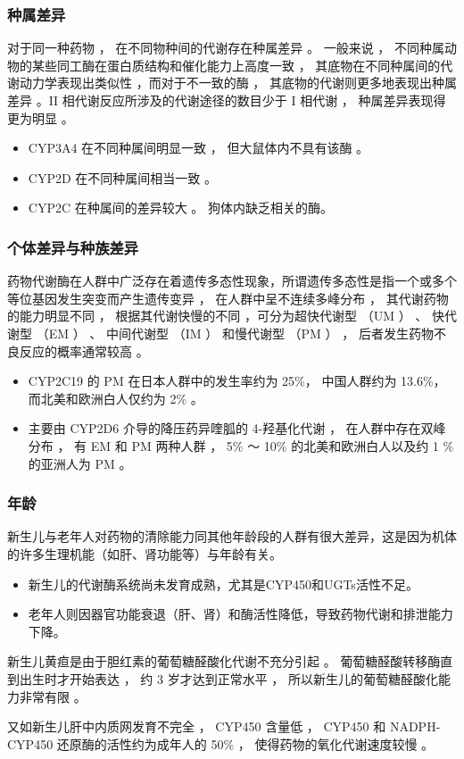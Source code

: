 \documentclass[dvipsnames, svgnames, x11names]{beamer}
\begin{document}
\begin{frame}
    \frametitle{种属差异}
    对于同一种药物 ， 在不同物种间的代谢存在种属差异 。 一般来说 ， 不同种属动物的某些同工酶在蛋白质结构和催化能力上高度一致 ， 其底物在不同种属间的代谢动力学表现出类似性 ，而对于不一致的酶 ， 其底物的代谢则更多地表现出种属差异 。II 相代谢反应所涉及的代谢途径的数目少于 I 相代谢 ， 种属差异表现得更为明显 。
    \begin{itemize}
      \item CYP3A4 在不同种属间明显一致 ， 但大鼠体内不具有该酶 。
      \item CYP2D 在不同种属间相当一致 。
      \item CYP2C 在种属间的差异较大 。 狗体内缺乏相关的酶。
    \end{itemize}
\end{frame}


\begin{frame}
    \frametitle{个体差异与种族差异}
    药物代谢酶在人群中广泛存在着遗传多态性现象，所谓遗传多态性是指一个或多个等位基因发生突变而产生遗传变异 ， 在人群中呈不连续多峰分布 ， 其代谢药物的能力明显不同 ， 根据其代谢快慢的不同 ，可分为超快代谢型 （UM ） 、 快代谢型 （EM ） 、 中间代谢型 （IM ） 和慢代谢型 （PM ） ， 后者发生药物不良反应的概率通常较高 。
    \begin{itemize}
      \item CYP2C19 的 PM 在日本人群中的发生率约为 25\%， 中国人群约为 13.6\%， 而北美和欧洲白人仅约为 2\% 。 
      \item 主要由 CYP2D6 介导的降压药异喹胍的 4-羟基化代谢 ， 在人群中存在双峰分布 ， 有 EM 和 PM 两种人群 ， 5\% ～ 10\% 的北美和欧洲白人以及约 1 \% 的亚洲人为 PM 。 
    \end{itemize}
\end{frame}


\begin{frame}
  \frametitle{年龄}
  新生儿与老年人对药物的清除能力同其他年龄段的人群有很大差异，这是因为机体的许多生理机能（如肝、肾功能等）与年龄有关。 
  \begin{itemize}
    \item 新生儿的代谢酶系统尚未发育成熟，尤其是CYP450和UGTs活性不足。
    \item 老年人则因器官功能衰退（肝、肾）和酶活性降低，导致药物代谢和排泄能力下降。
  \end{itemize}
  \begin{blankblock}{}
    新生儿黄疸是由于胆红素的葡萄糖醛酸化代谢不充分引起 。 葡萄糖醛酸转移酶直到出生时才开始表达 ， 约 3 岁才达到正常水平 ， 所以新生儿的葡萄糖醛酸化能力非常有限 。 
    
    又如新生儿肝中内质网发育不完全 ， CYP450 含量低 ， CYP450 和 NADPH-CYP450 还原酶的活性约为成年人的 50\% ， 使得药物的氧化代谢速度较慢 。
  \end{blankblock}
\end{frame}
\end{document}
